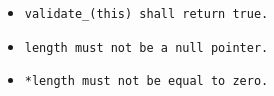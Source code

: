\begin{itemize}[nosep]

\item \tt{validate_(this)} shall return \tt{true}.

\item \phantom{*}\tt{length} must not be a null pointer.

\item \tt{*length} must not be equal to zero.

\end{itemize}
